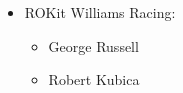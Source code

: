 \documentclass{report}
\begin{document}
\begin{itemize}
\begin{itemize}
\begin{figure}[!h]
\begin{floatrow}
        \end{floatrow}
        \end{figure}
        \end{itemize}
    \bigskip\bigskip\bigskip\bigskip\bigskip\bigskip\bigskip
    \item ROKit Williams Racing:
        \begin{itemize}
            \item George Russell 
            \item Robert Kubica
            \bigskip
            \begin{figure}[!h]
            \begin{floatrow}

\end{floatrow}
\end{figure}
\end{itemize}
\end{itemize}
\end{document}
